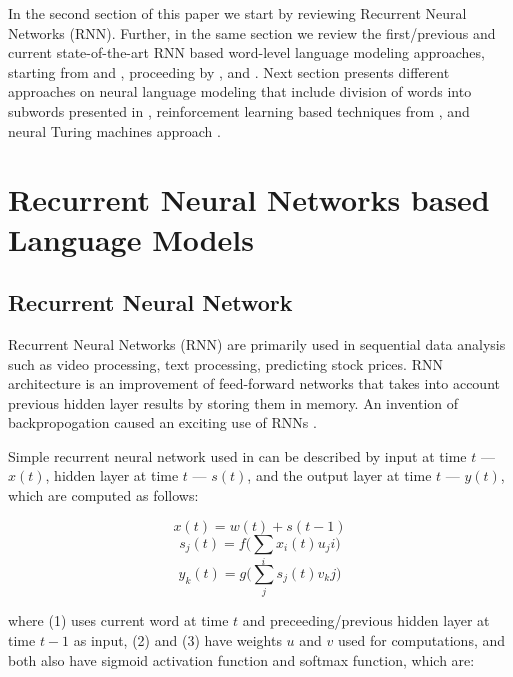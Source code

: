 \documentclass{IEEEtran}
\begin{document}
In the second section of this paper we start by reviewing Recurrent Neural Networks (RNN). Further, in the same section we review the first/previous and current state-of-the-art RNN based word-level language modeling approaches, starting from \cite{Mikolov2010NeuralLM} and \cite{Mikolov2011ExtensionsOR}, proceeding by \cite{Zaremba2014LSTM}, and \cite{Salakhutdinov2017Softmax}. Next section presents different approaches on neural language modeling that include division of words into subwords presented in \cite{Mikolov2011SubwordLM}, reinforcement learning based techniques from \cite{}, and neural Turing machines approach \cite{}.

\section{Recurrent Neural Networks based Language Models}

\subsection{Recurrent Neural Network}

Recurrent Neural Networks (RNN) are primarily used in sequential data analysis such as video processing, text processing, predicting stock prices. RNN architecture is an improvement of feed-forward networks that takes into account previous hidden layer results by storing them in memory. An invention of backpropogation caused an exciting use of RNNs \cite{deeplearning}.

Simple recurrent neural network used in \cite{Mikolov2010NeuralLM} can be described by input at time \(t\) --- \(x(t)\), hidden layer at time \(t\) --- \(s(t)\), and the output layer at time \(t\) --- \(y(t)\), which are computed as follows:

\begin{equation}
	x(t) = w(t) + s(t-1)
\end{equation}
\begin{equation}
	s_j(t) = f\Bigg(\sum_i{x_i(t)u_ji}\Bigg)
\end{equation}
\begin{equation}
	y_k(t) = g\Bigg(\sum_j{s_j(t) v_kj}\Bigg)
\end{equation}

where (1) uses current word at time \(t\) and preceeding/previous hidden layer at time \(t-1\) as input, (2) and (3) have weights \(u\) and \(v\) used for computations, and both also have sigmoid activation function and softmax function, which are:
\end{document}
